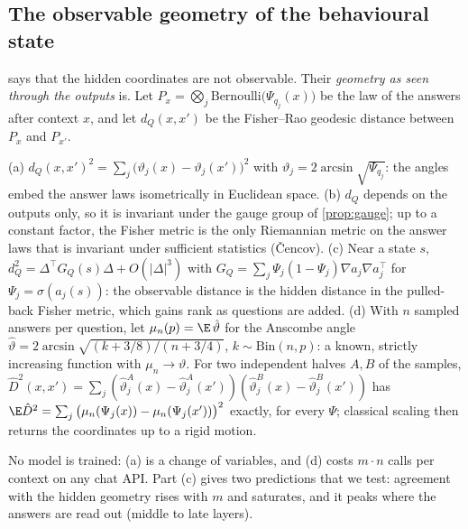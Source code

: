 \subsection{The observable geometry of the behavioural state}
\label{sec:geometry}
 says that the hidden coordinates are not observable. Their \emph{geometry as seen through the outputs} is. Let $P_x=\bigotimes_{j}\mathrm{Bernoulli}\big(\Psi_{q_j}(x)\big)$ be the law of the answers after context $x$, and let $d_Q(x,x')$ be the Fisher--Rao geodesic distance between $P_x$ and $P_{x'}$.
\begin{theorem}\label{thm:geometry}
(a) $d_Q(x,x')^2=\sum_j\big(\vartheta_j(x)-\vartheta_j(x')\big)^2$ with $\vartheta_j=2\arcsin\sqrt{\Psi_{q_j}}$: the angles embed the answer laws isometrically in Euclidean space.
(b) $d_Q$ depends on the outputs only, so it is invariant under the gauge group of \cref{prop:gauge}; up to a constant factor, the Fisher metric is the only Riemannian metric on the answer laws that is invariant under sufficient statistics (\v{C}encov).
(c) Near a state $s$, $d_Q^2=\Delta^{\top}G_Q(s)\Delta+O(|\Delta|^3)$ with $G_Q=\sum_j\Psi_j(1-\Psi_j)\nabla a_j\nabla a_j^{\top}$ for $\Psi_j=\sigma(a_j(s))$: the observable distance is the hidden distance in the pulled-back Fisher metric, which gains rank as questions are added.
(d) With $n$ sampled answers per question, let $\mu_n(p)=\E\,\hat\vartheta$ for the Anscombe angle $\hat\vartheta=2\arcsin\sqrt{(k+3/8)/(n+3/4)}$, $k\sim\mathrm{Bin}(n,p)$: a known, strictly increasing function with $\mu_n\to\vartheta$. For two independent halves $A,B$ of the samples, $\hat D^2(x,x')=\sum_j(\hat\vartheta^A_j(x)-\hat\vartheta^A_j(x'))(\hat\vartheta^B_j(x)-\hat\vartheta^B_j(x'))$ has $\E\hat D^2=\sum_j\big(\mu_n(\Psi_j(x))-\mu_n(\Psi_j(x'))\big)^2$ exactly, for every $\Psi$; classical scaling then returns the coordinates up to a rigid motion.
\end{theorem}
No model is trained: (a) is a change of variables, and (d) costs $m\cdot n$ calls per context on any chat API. Part (c) gives two predictions that we test: agreement with the hidden geometry rises with $m$ and saturates, and it peaks where the answers are read out (middle to late layers).

